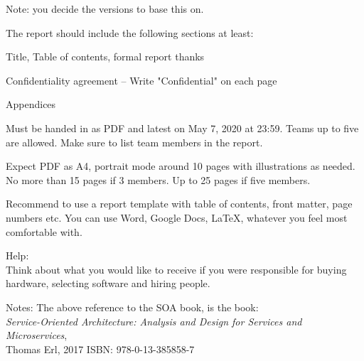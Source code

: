 \documentclass[a4paper,11pt,notitlepage]{report}
\begin{document}
Note: you decide the versions to base this on.

The report should include the following sections at least:
\begin{list2}
\item Title, Table of contents, formal report thanks
\item Confidentiality agreement -- Write "Confidential" on each page
\item Appendices 
\end{list2}


Must be handed in as PDF and latest on May 7, 2020 at 23:59. Teams up to five are allowed. Make sure to list team members in the report.

Expect PDF as A4, portrait mode around 10 pages with illustrations as needed.
No more than 15 pages if 3 members. Up to 25 pages if five members.

Recommend to use a report template with table of contents, front matter, page numbers etc. You can use Word, Google Docs, LaTeX, whatever you feel most comfortable with.


Help:\\
Think about what you would like to receive if you were responsible for buying hardware, selecting software and hiring people.

Notes: The above reference to the SOA book, is the book:\\
\emph{Service-Oriented Architecture: Analysis and Design for Services and Microservices},\\ Thomas Erl, 2017
ISBN: 978-0-13-385858-7
\end{document}
